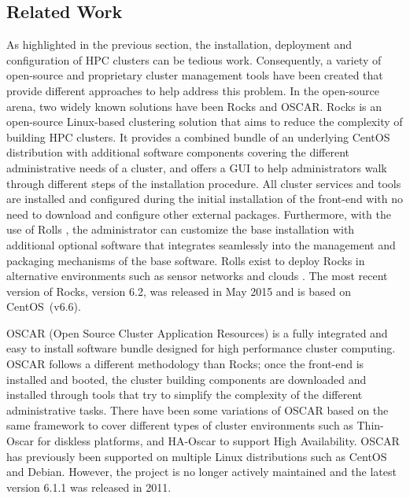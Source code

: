 \subsection{Related Work} \label{sec:related_work}

As highlighted in the previous section, the installation, deployment and
configuration of HPC clusters can be tedious work.  Consequently, a variety of
open-source and proprietary cluster management tools have been created that
provide different approaches to help address this problem.  In the open-source
arena, two widely known solutions have been Rocks and OSCAR.  Rocks
\cite{rocks2003,rocks_url} is an open-source Linux-based clustering solution
that aims to reduce the complexity of building HPC clusters.  It provides a
combined bundle of an underlying CentOS distribution with additional software
components covering the different administrative needs of a cluster,
and offers a GUI to help administrators walk through
different steps of the installation procedure.  All cluster services and tools
are installed and configured during the initial installation of the front-end
with no need to download and %
configure other external
packages. Furthermore, with the use of Rolls \cite{rolls2004}, the
administrator can customize the base installation
with additional
optional software that integrates seamlessly
into the management and
packaging mechanisms of the base software.
Rolls
exist to deploy Rocks in alternative environments
such as sensor networks \cite{rolls_sensors2012} and clouds \cite{rolls_cloud2011}.
The most recent version of Rocks, version 6.2, was released in May 2015 and is
based on CentOS~(v6.6).

OSCAR \cite{oscar2001,oscar_url} (Open Source Cluster Application Resources) is
a fully integrated and easy to install software bundle designed for high
performance cluster computing.
OSCAR follows a different methodology than Rocks; once
the front-end is installed and booted, the cluster building components are
downloaded and installed through tools that try to simplify the complexity of
the different administrative tasks.  There have been some variations of OSCAR
based on the same framework to cover different types of cluster environments
such as Thin-Oscar for diskless platforms, and HA-Oscar to support High
Availability. OSCAR has previously been supported on multiple Linux distributions such as
CentOS and Debian. However,
the project is no longer actively maintained and the latest
version 6.1.1 was released in 2011.

